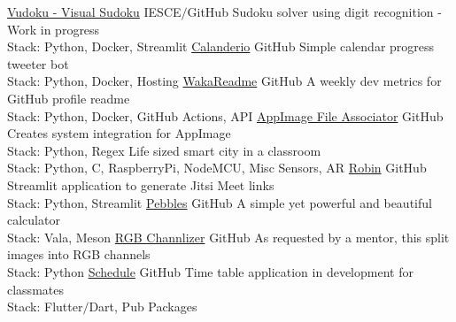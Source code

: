 \documentclass[
	a4paper,
]{fortysecondscv}
\begin{document}
\begin{cvtable}[1.5]
\end{cvtable}


\newpage
\makebacksidebar

\begin{cvtable}[2]
    {\href{https://github.com/joe733/vudoku}{Vudoku - Visual Sudoku}}
    {IESCE$/$GitHub}
    {Sudoku solver using digit recognition - Work in progress\\
    Stack: Python, Docker, Streamlit}
    {\href{https://github.com/joe733/Calendario/}{Calanderio}}
    {GitHub}
	{Simple calendar progress tweeter bot\\
	Stack: Python, Docker, Hosting}
	{\href{https://github.com/athul/waka-readme}{WakaReadme}}
	{GitHub}
	{A weekly dev metrics for GitHub profile readme\\
	Stack: Python, Docker, GitHub Actions, API}
	{\href{https://github.com/joe733/appimage_file_associator}{AppImage File Associator}}
	{GitHub}
	{Creates system integration for AppImage\\
	Stack: Python, Regex}
	{Life sized smart city in a classroom\\
	Stack: Python, C, RaspberryPi, NodeMCU, Misc Sensors, AR}
	{\href{https://github.com/joe733/robin}{Robin}}
	{GitHub}
	{Streamlit application to generate Jitsi Meet links\\
	Stack: Python, Streamlit}
	{\href{https://github.com/joe733/pebbles}{Pebbles}}
	{GitHub}
	{A simple yet powerful and beautiful calculator\\
	Stack: Vala, Meson}
	{\href{https://github.com/joe733/eye-defect/}{RGB Channlizer}}
	{GitHub}
	{As requested by a mentor, this split images into RGB channels\\
	Stack: Python}
	{\href{https://github.com/joe733/schedule}{Schedule}}
	{GitHub}
	{Time table application in development for classmates\\
	Stack: Flutter$/$Dart, Pub Packages}
\end{cvtable}
\end{document}
